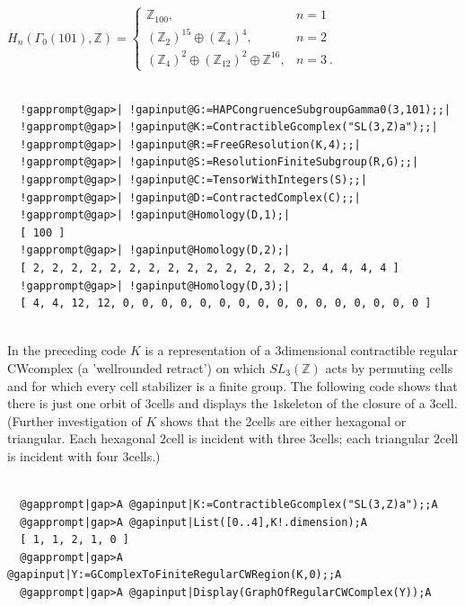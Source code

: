 \documentclass[a4paper,11pt]{report}
\begin{document}
{{$H_n(\Gamma_0(101),\mathbb Z)= \left\{\begin{array}{ll} \mathbb Z_{100}, &
n=1\\ (\mathbb Z_2)^{15}\oplus (\mathbb Z_4)^4, &n=2\\ (\mathbb Z_4)^2 \oplus
(\mathbb Z_{12})^2 \oplus \mathbb Z^{16}, & n=3 \ . \end{array}\right.$ 
\begin{Verbatim}[commandchars=!@|,fontsize=\small,frame=single,label=Example]
  	
  !gapprompt@gap>| !gapinput@G:=HAPCongruenceSubgroupGamma0(3,101);;|
  !gapprompt@gap>| !gapinput@K:=ContractibleGcomplex("SL(3,Z)a");;|
  !gapprompt@gap>| !gapinput@R:=FreeGResolution(K,4);;|
  !gapprompt@gap>| !gapinput@S:=ResolutionFiniteSubgroup(R,G);;|
  !gapprompt@gap>| !gapinput@C:=TensorWithIntegers(S);;|
  !gapprompt@gap>| !gapinput@D:=ContractedComplex(C);;|
  !gapprompt@gap>| !gapinput@Homology(D,1);|
  [ 100 ]
  !gapprompt@gap>| !gapinput@Homology(D,2);|
  [ 2, 2, 2, 2, 2, 2, 2, 2, 2, 2, 2, 2, 2, 2, 2, 4, 4, 4, 4 ]
  !gapprompt@gap>| !gapinput@Homology(D,3);|
  [ 4, 4, 12, 12, 0, 0, 0, 0, 0, 0, 0, 0, 0, 0, 0, 0, 0, 0, 0, 0 ]
  
\end{Verbatim}
 In the preceding code $K$ is a representation of a $3$\texttt{}dimensional contractible regular
CW\texttt{}complex (a 'well\texttt{}rounded retract') on
which $SL_3(\mathbb Z)$ acts by permuting cells and for which every cell stabilizer is a finite group.
The following code shows that there is just one orbit of $3$\texttt{}cells and displays the $1$\texttt{}skeleton of the closure of a $3$\texttt{}cell. (Further investigation of $K$ shows that the 2\texttt{}cells are either hexagonal or triangular.
Each hexagonal $2$\texttt{}cell is incident with three $3$\texttt{}cells; each triangular $2$\texttt{}cell is incident with four $3$\texttt{}cells.) 
\begin{Verbatim}[commandchars=@|A,fontsize=\small,frame=single,label=Example]
          
  @gapprompt|gap>A @gapinput|K:=ContractibleGcomplex("SL(3,Z)a");;A
  @gapprompt|gap>A @gapinput|List([0..4],K!.dimension);A
  [ 1, 1, 2, 1, 0 ]
  @gapprompt|gap>A @gapinput|Y:=GComplexToFiniteRegularCWRegion(K,0);;A
  @gapprompt|gap>A @gapinput|Display(GraphOfRegularCWComplex(Y));A
  
\end{Verbatim}
  

}}
\end{document}
